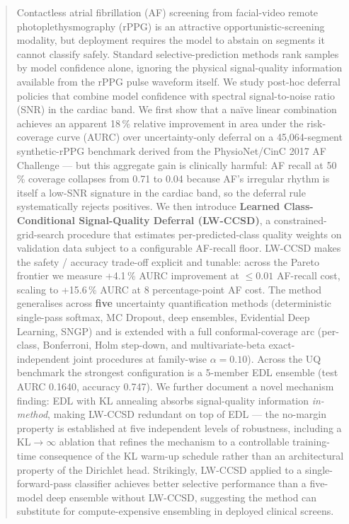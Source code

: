 \documentclass[journal]{IEEEtran}
\begin{document}
\begin{abstract}
Contactless atrial fibrillation (AF) screening from facial-video remote photoplethysmography (rPPG) is an attractive opportunistic-screening modality, but deployment requires the model to abstain on segments it cannot classify safely. Standard selective-prediction methods rank samples by model confidence alone, ignoring the physical signal-quality information available from the rPPG pulse waveform itself. We study post-hoc deferral policies that combine model confidence with spectral signal-to-noise ratio (SNR) in the cardiac band. We first show that a na\"{i}ve linear combination achieves an apparent 18\,\% relative improvement in area under the risk-coverage curve (AURC) over uncertainty-only deferral on a 45{,}064-segment synthetic-rPPG benchmark derived from the PhysioNet/CinC 2017 AF Challenge --- but this aggregate gain is clinically harmful: AF recall at 50\,\% coverage collapses from 0.71 to 0.04 because AF's irregular rhythm is itself a low-SNR signature in the cardiac band, so the deferral rule systematically rejects positives. We then introduce \textbf{Learned Class-Conditional Signal-Quality Deferral (LW-CCSD)}, a constrained-grid-search procedure that estimates per-predicted-class quality weights on validation data subject to a configurable AF-recall floor. LW-CCSD makes the safety / accuracy trade-off explicit and tunable: across the Pareto frontier we measure +4.1\,\% AURC improvement at $\leq 0.01$ AF-recall cost, scaling to +15.6\,\% AURC at 8 percentage-point AF cost. The method generalises across \textbf{five} uncertainty quantification methods (deterministic single-pass softmax, MC Dropout, deep ensembles, Evidential Deep Learning, SNGP) and is extended with a full conformal-coverage arc (per-class, Bonferroni, Holm step-down, and multivariate-beta exact-independent joint procedures at family-wise $\alpha=0.10$). Across the UQ benchmark the strongest configuration is a 5-member EDL ensemble (test AURC 0.1640, accuracy 0.747). We further document a novel mechanism finding: EDL with KL annealing absorbs signal-quality information \emph{in-method}, making LW-CCSD redundant on top of EDL --- the no-margin property is established at five independent levels of robustness, including a KL$\to\infty$ ablation that refines the mechanism to a controllable training-time consequence of the KL warm-up schedule rather than an architectural property of the Dirichlet head. Strikingly, LW-CCSD applied to a single-forward-pass classifier achieves better selective performance than a five-model deep ensemble without LW-CCSD, suggesting the method can substitute for compute-expensive ensembling in deployed clinical screens.
\end{abstract}
\end{document}
